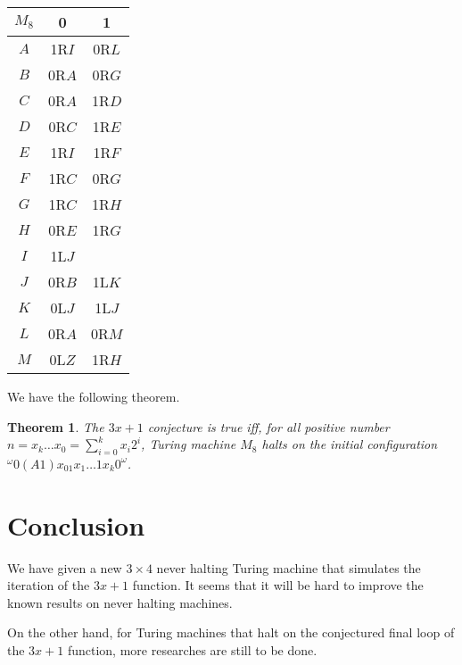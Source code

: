 \documentclass[10pt]{article}
\newtheorem{thm}[prop]{Theorem}
\begin{document}
\begin{center}
\begin{tabular}{|c|c|c|}
\hline
$M_8$ &  0  &   1   \\
\hline
$A$ & 1R$I$ & 0R$L$ \\
\hline
$B$ & 0R$A$ & 0R$G$ \\
\hline
$C$ & 0R$A$ & 1R$D$ \\
\hline
$D$ & 0R$C$ & 1R$E$ \\
\hline
$E$ & 1R$I$ & 1R$F$ \\
\hline
$F$ & 1R$C$ & 0R$G$ \\
\hline
$G$ & 1R$C$ & 1R$H$ \\
\hline
$H$ & 0R$E$ & 1R$G$ \\
\hline
$I$ & 1L$J$ &       \\
\hline
$J$ & 0R$B$ & 1L$K$ \\
\hline
$K$ & 0L$J$ & 1L$J$ \\
\hline
$L$ & 0R$A$ & 0R$M$ \\
\hline
$M$ & 0L$Z$ & 1R$H$ \\
\hline
\end{tabular}
\end{center}

We have the following theorem.
\begin{thm}
The $3x + 1$ conjecture is true iff, for all positive number
$n = x_k\ldots x_0 = \sum_{i=0}^k x_i2^i$, Turing machine $M_8$ halts on the
initial configuration $^\omega 0(A1)x_01x_1\ldots 1x_k0^\omega$.
\end{thm}

\section{Conclusion}
We have given a new $3 \times 4$ never halting Turing machine
that simulates the iteration of the $3x + 1$ function.
It seems that it will be hard to improve the known results
on never halting machines.

On the other hand, for Turing machines that halt on the conjectured
final loop of the $3x + 1$ function, more researches are still to be done.
\end{document}
